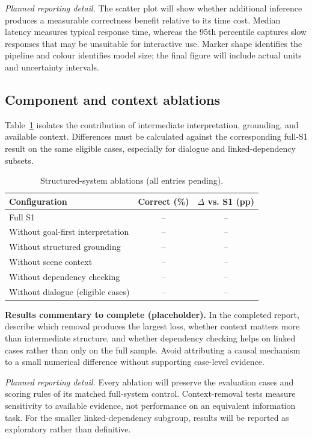 \documentclass[10pt,conference]{IEEEtran}
\renewcommand{\arraystretch}{1.10}
\begin{document}
\noindent\textit{Planned reporting detail.} The scatter plot will show whether additional inference produces a measurable correctness benefit relative to its time cost. Median latency measures typical response time, whereas the 95th percentile captures slow responses that may be unsuitable for interactive use. Marker shape identifies the pipeline and colour identifies model size; the final figure will include actual units and uncertainty intervals.

\FloatBarrier
\subsection{Component and context ablations}
Table~\ref{tab:ablations} isolates the contribution of intermediate interpretation, grounding, and available context. Differences must be calculated against the corresponding full-S1 result on the same eligible cases, especially for dialogue and linked-dependency subsets.
\begin{table}[!tbp]
\caption{Structured-system ablations (all entries pending).}
\label{tab:ablations}
\centering\small
\renewcommand{\arraystretch}{1.30}
\begin{tabularx}{\columnwidth}{@{}Xcc@{}}
\toprule
\textbf{Configuration} & \textbf{Correct (\%)} & \textbf{$\Delta$ vs. S1 (pp)}\\
\midrule
Full S1 & -- & --\\
Without goal-first interpretation & -- & --\\
Without structured grounding & -- & --\\
Without scene context & -- & --\\
Without dependency checking & -- & --\\
Without dialogue (eligible cases) & -- & --\\
\bottomrule
\end{tabularx}
\end{table}
\noindent\textbf{Results commentary to complete (placeholder).}  In the completed report, describe which removal produces the largest loss, whether context matters more than intermediate structure, and whether dependency checking helps on linked cases rather than only on the full sample. Avoid attributing a causal mechanism to a small numerical difference without supporting case-level evidence.

\noindent\textit{Planned reporting detail.} Every ablation will preserve the evaluation cases and scoring rules of its matched full-system control. Context-removal tests measure sensitivity to available evidence, not performance on an equivalent information task. For the smaller linked-dependency subgroup, results will be reported as exploratory rather than definitive.
\end{document}
